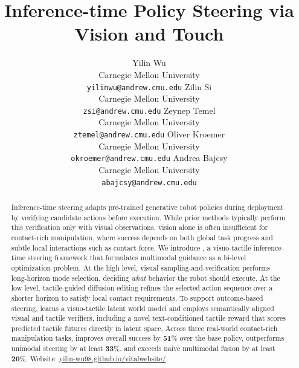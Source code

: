 \documentclass{article}
\title{Inference-time Policy Steering via Vision and Touch}
\author{
  Yilin Wu\\
  Carnegie Mellon University\\
\texttt{yilinwu@andrew.cmu.edu} \And 
Zilin Si \\
 Carnegie Mellon University\\
\texttt{zsi@andrew.cmu.edu}
\And 
Zeynep Temel \\
 Carnegie Mellon University\\
\texttt{ztemel@andrew.cmu.edu}
\And 
Oliver Kroemer \\
 Carnegie Mellon University\\
\texttt{okroemer@andrew.cmu.edu}
\And 
Andrea Bajcsy \\
 Carnegie Mellon University\\
\texttt{abajcsy@andrew.cmu.edu}
}
\begin{document}
\maketitle



\begin{abstract}
Inference-time steering adapts pre-trained generative robot policies during deployment by verifying candidate actions before execution. While prior methods typically perform this verification only with visual observations, vision alone is often insufficient for contact-rich manipulation, where success depends on both global task progress and subtle local interactions such as contact force. We introduce \ours, a visuo-tactile inference-time steering framework that formulates multimodal guidance as a bi-level optimization problem. At the high level, visual sampling-and-verification performs long-horizon mode selection, deciding \textit{what} behavior the robot should execute. At the low level, tactile-guided diffusion editing refines the selected action sequence over a shorter horizon to satisfy local contact requirements. To support outcome-based steering, \ours learns a visuo-tactile latent world model and employs semantically aligned visual and tactile verifiers, including a novel text-conditioned tactile reward that scores predicted tactile futures directly in latent space. Across three real-world contact-rich manipulation tasks, \ours improves overall success by $\mathbf{51}\%$ over the base policy, outperforms unimodal steering by at least $\mathbf{33}\%$, and exceeds naive multimodal fusion by at least $\mathbf{20}\%$. Website: \href{https://yilin-wu98.github.io/vital_website/}{yilin-wu98.github.io/vital\textunderscore website/}.

\end{abstract}












\clearpage


\clearpage
\appendix

\end{document}

